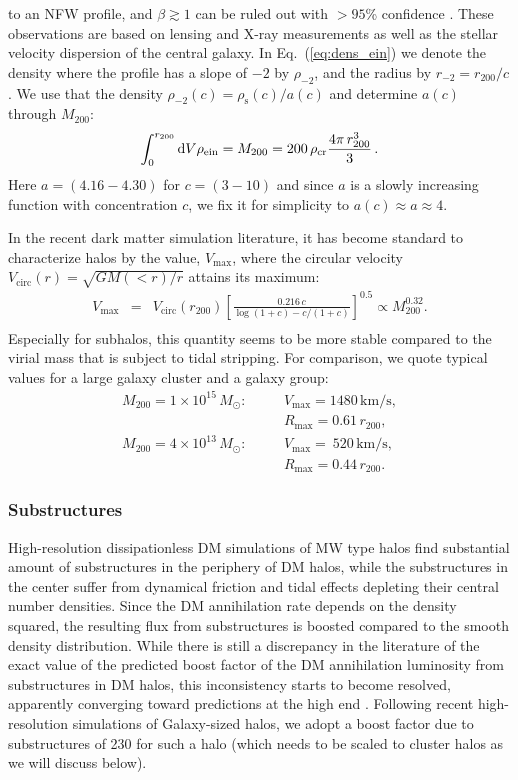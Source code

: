 \documentclass[10pt,aps,pra,reprint,amsmath,amsfonts,amssymb,showpacs,nofootinbib,floatfix]{revtex4-1}
\newcommand{\rmn}{\mathrm}
\newcommand{\msun}{M_\odot}
\newcommand{\s}{\rmn{s}}
\newcommand{\dd}{\rmn{d}}
\newcommand{\rvir}{r_{200}}
\newcommand{\mvir}{M_{200}}
\begin{document}
to an NFW profile, and $\beta\gtrsim 1$ can be ruled out with $>95$\%
confidence \cite{2011ApJ...728L..39N}. These observations are based on
lensing and X-ray measurements as well as the stellar velocity
dispersion of the central galaxy. In Eq.~(\ref{eq:dens_ein}) we denote
the density where the profile has a slope of $-2$ by $\rho_{-2}$, and
the radius by $r_{-2}=\rvir/c$. We use that the density
$\rho_{-2}(c)=\rho_\s(c)/a(c)$ and determine $a(c)$ through $\mvir$:
\begin{equation}
\int_0^{\rvir}\dd V \rho_{\rm ein} = \mvir =
200\,\rho_{\rmn{cr}} \frac{4\pi\,\rvir^3}{3} \,.
\end{equation}
Here $a=(4.16-4.30)$ for $c=(3-10)$ and since $a$ is a slowly
increasing function with concentration $c$, we fix it for simplicity
to $a(c)\approx a \approx 4$.

In the recent dark matter simulation literature, it has become
standard to characterize halos by the value, $V_\rmn{max}$, where the
circular velocity $V_\rmn{circ}(r)=\sqrt{GM(<r)/r}$ attains its
maximum:
\begin{eqnarray}
V_\rmn{max} &=& V_\rmn{circ}(\rvir)
\left[\frac{0.216\,c}{\log(1+c)-c/(1+c)}\right]^{0.5}\propto \mvir^{0.32}.\nonumber\\
\end{eqnarray}
Especially for subhalos, this quantity seems to be more stable
compared to the virial mass that is subject to tidal stripping. For
comparison, we quote typical values for a large galaxy cluster and a
galaxy group:
\begin{eqnarray}
M_{200} = 1\times10^{15}\,\msun:\quad &&V_\rmn{max}=1480\,\rmn{km/s}, \nonumber\\
                                     &&R_\rmn{max}=0.61\,\rvir, \\
M_{200} = 4\times10^{13}\,\msun:\quad &&V_\rmn{max}=~520\,\rmn{km/s}, \nonumber\\
                                     &&R_\rmn{max}=0.44\,\rvir.
\end{eqnarray}


\subsubsection{Substructures}
\label{sect:subst}
High-resolution dissipationless DM simulations of MW type halos find
substantial amount of substructures in the periphery of DM halos,
while the substructures in the center suffer from dynamical friction
and tidal effects depleting their central number densities. Since the
DM annihilation rate depends on the density squared, the resulting
flux from substructures is boosted compared to the smooth density
distribution. While there is still a discrepancy in the literature of
the exact value of the predicted boost factor of the DM annihilation
luminosity from substructures in DM halos, this inconsistency starts
to become resolved, apparently converging toward predictions at the
high end \protect \cite{2008MNRAS.391.1685S, 2008Natur.456...73S,
  2010ApJ...718..899A}. Following recent high-resolution simulations
of Galaxy-sized halos, we adopt a boost factor due to substructures of
230 for such a halo \cite{2008MNRAS.391.1685S} (which needs to be
scaled to cluster halos as we will discuss below).
\end{document}

